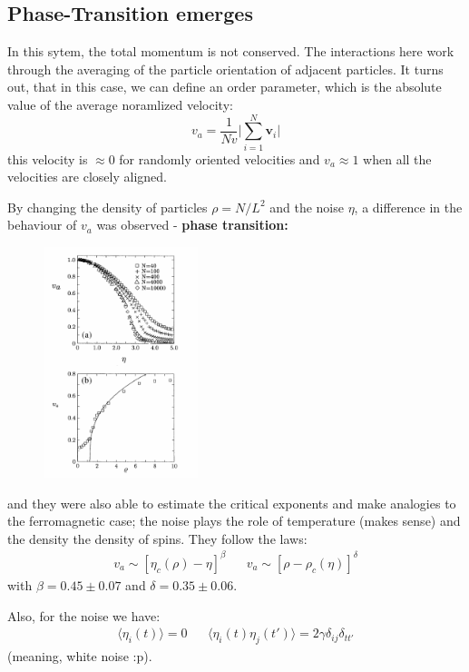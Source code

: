 \documentclass[a4paper]{article}
\begin{document}
\subsection{Phase-Transition emerges}

In this sytem, the total momentum is not conserved. The interactions here work through the averaging of the particle orientation of adjacent particles. It turns out, that in this case, we can define an order parameter, which is the absolute value of the average noramlized velocity:
%
\begin{equation}
	v_a = \frac{1}{Nv}\vert \sum_{i=1}^N \mathbf{v}_i \vert
\end{equation}
%
this velocity is $\approx 0$ for randomly oriented velocities and $v_a\approx 1$ when all the velocities are closely aligned.

By changing the density of particles $\rho= N/L^2$ and the noise $\eta$, a difference in the behaviour of $v_a$ was observed - \textbf{phase transition:}
%
\begin{figure}[H]
	\centering
	\includegraphics[width=0.4\textwidth]{vicseck-phase-transition.png}
\end{figure} 
%
and they were also able to estimate the critical exponents and make analogies to the ferromagnetic case; the noise plays the role of temperature (makes sense) and the density the density of spins. They follow the laws:
%
\begin{align}
	v_a \sim [\eta_c(\rho)-\eta]^\beta && v_a \sim [\rho-\rho_c(\eta)]^\delta
\end{align}
%
with  $\beta = 0.45 \pm 0.07$ and $\delta = 0.35 \pm 0.06$.

Also, for the noise we have:
%
\begin{align}
	\langle \eta_i(t) \rangle = 0 && \langle \eta_i(t)\eta_j(t')\rangle= 2\gamma \delta_{ij}\delta_{tt'}
\end{align}
%
(meaning, white noise :p).
\end{document}
